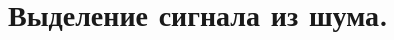\documentclass[../main/main.tex]{subfiles}
\begin{document}
\section{Выделение сигнала из шума.}
\end{document}
